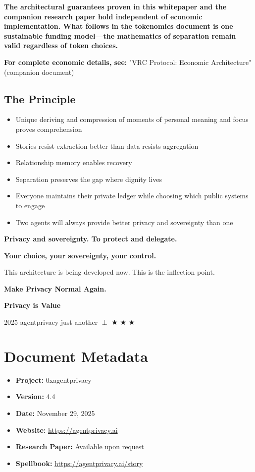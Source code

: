 \documentclass[11pt,a4paper]{article}
\theoremstyle{definition}
\begin{document}
\textbf{The architectural guarantees proven in this whitepaper and the companion research paper hold independent of economic implementation. What follows in the tokenomics document is one sustainable funding model---the mathematics of separation remain valid regardless of token choices.}

\textbf{For complete economic details, see:} "VRC Protocol: Economic Architecture" (companion document)

\subsection{The Principle}

\begin{itemize}
    \item Unique deriving and compression of moments of personal meaning and focus proves comprehension
    \item Stories resist extraction better than data resists aggregation
    \item Relationship memory enables recovery
    \item Separation preserves the gap where dignity lives
    \item Everyone maintains their private ledger while choosing which public systems to engage
    \item Two agents will always provide better privacy and sovereignty than one
\end{itemize}

\textbf{Privacy and sovereignty. To protect and delegate.}

\textbf{Your choice, your sovereignty, your control.}

This architecture is being developed now. This is the inflection point.

\textbf{Make Privacy Normal Again.}

\textbf{Privacy is Value}

2025 agentprivacy just another $\perp$ $\bigstar$ $\bigstar$ $\bigstar$

\section*{Document Metadata}

\begin{itemize}
    \item \textbf{Project:} 0xagentprivacy
    \item \textbf{Version:} 4.4
    \item \textbf{Date:} November 29, 2025
    \item \textbf{Website:} \url{https://agentprivacy.ai}
    \item \textbf{Research Paper:} Available upon request
    \item \textbf{Spellbook:} \url{https://agentprivacy.ai/story}
\end{itemize}
\end{document}
